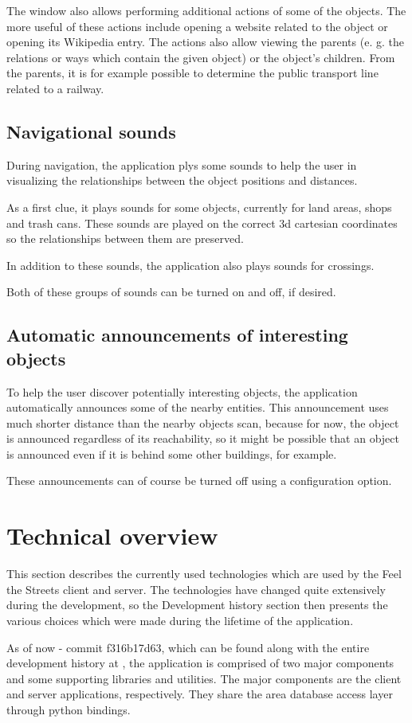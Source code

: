 \documentclass[nolof,digital]{fithesis3}
\begin{document}
The window also allows performing additional actions of some of the objects. The more useful of these actions include opening a website related to the object or opening its Wikipedia entry. The actions also allow viewing the parents (e. g. the relations or ways which contain the given object) or the object's children. From the parents, it is for example possible to determine the public transport line related to a railway.
\subsection{Navigational sounds}
During navigation, the application plys some sounds to help the user in visualizing the relationships between the object positions and distances.

As a first clue, it plays sounds for some objects, currently for land areas, shops and trash cans. These sounds are played on the correct 3d cartesian coordinates so the relationships between them are preserved.

In addition to these sounds, the application also plays sounds for crossings.

Both of these groups of sounds can be turned on and off, if desired.
\subsection{Automatic announcements of interesting objects}
To help the user discover potentially interesting objects, the application automatically announces some of the nearby entities. This announcement uses much shorter distance than the nearby objects scan, because for now, the object is announced regardless of its reachability, so it might be possible that an object is announced even if it is behind some other buildings, for example.

These announcements can of course be turned off using a configuration option.
\section{Technical overview}
This section describes the currently used technologies which are used by the Feel the Streets client and server. The technologies have changed quite extensively during the development, so the Development history section then presents the various choices which were made during the lifetime of the application.

As of now - commit f316b17d63, which can be found along with the entire development history at \parencite{fts_repo}, the application is comprised of two major components and some supporting libraries and utilities. The major components are the client and server applications, respectively. They share the area database access layer through python bindings.
\end{document}
